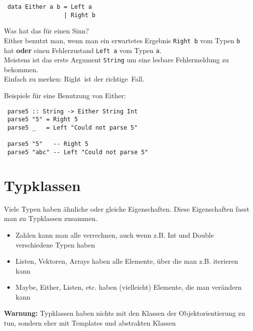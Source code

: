 \documentclass{beamer}
\begin{document}
\begin{frame}[fragile]
 \begin{verbatim}
 data Either a b = Left a
                 | Right b
 \end{verbatim}
 \pause
 Was hat das für einen Sinn?\\
 \pause
 Either benutzt man, wenn man ein erwartetes Ergebnis \texttt{Right b} vom Typen \texttt{b} hat \textbf{oder} einen Fehlerzustand \texttt{Left a} vom Typen \texttt{a}.\\
 Meistens ist das erste Argument \texttt{String} um eine lesbare Fehlermeldung zu bekommen.\\
 \pause
 \bigskip
 Einfach zu merken: \glqq Right\grqq \ ist der \glqq richtige\grqq \ Fall.
\end{frame}

\begin{frame}[fragile]
 Beispiele für eine Benutzung von Either:
 \begin{verbatim}
 parse5 :: String -> Either String Int
 parse5 "5" = Right 5
 parse5 _   = Left "Could not parse 5"
 
 parse5 "5"   -- Right 5
 parse5 "abc" -- Left "Could not parse 5"
 \end{verbatim}
\end{frame}

\section{Typklassen}
\begin{frame}
Viele Typen haben ähnliche oder gleiche Eigenschaften. Diese Eigenschaften fasst man zu Typklassen zusammen.\\
\pause
\begin{itemize}
 \item Zahlen kann man alle verrechnen, auch wenn z.B. Int und Double verschiedene Typen haben
 \item Listen, Vektoren, Arrays haben alle Elemente, über die man z.B. iterieren kann
 \item Maybe, Either, Listen, etc. haben (vielleicht) Elemente, die man verändern kann
\end{itemize}
\pause
\begin{important}
\textbf{Warnung:} Typklassen haben nichts mit den Klassen der Objektorientierung zu tun, sondern eher mit Templates und abstrakten Klassen
\end{important}
\end{frame}
\end{document}

